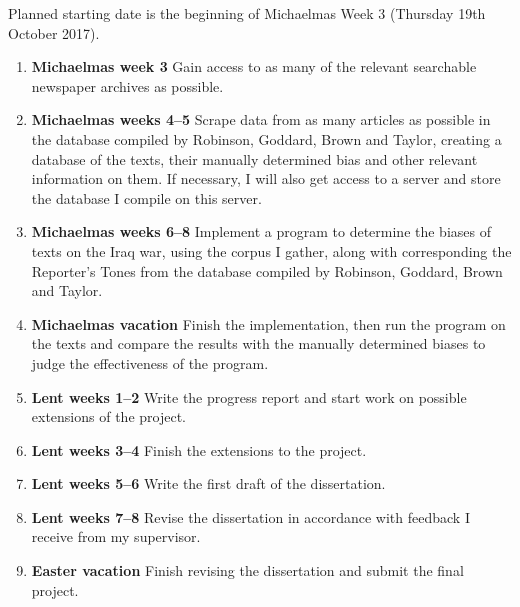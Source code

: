 \documentclass[12pt,a4paper,twoside]{article}
\begin{document}
Planned starting date is the beginning of Michaelmas Week 3 (Thursday 19th October 2017).

\begin{enumerate}

\item \textbf{Michaelmas week 3} Gain access to as many of the relevant searchable newspaper archives as possible.

\item \textbf{Michaelmas weeks 4--5} Scrape data from as many articles as possible in the database compiled by Robinson, Goddard, Brown and Taylor, creating a database of the texts, their manually determined bias and other relevant information on them. If necessary, I will also get access to a server and store the database I compile on this server.

\item \textbf{Michaelmas weeks 6--8} Implement a program to determine the biases of texts on the Iraq war, using the corpus I gather, along with corresponding the Reporter’s Tones from the database compiled by Robinson, Goddard, Brown and Taylor.

\item \textbf{Michaelmas vacation} Finish the implementation, then run the program on the texts and compare the results with the manually determined biases to judge the effectiveness of the program.

\item \textbf{Lent weeks 1--2} Write the progress report and start work on possible extensions of the project.

\item \textbf{Lent weeks 3--4} Finish the extensions to the project.

\item \textbf{Lent weeks 5--6} Write the first draft of the dissertation.

\item \textbf{Lent weeks 7--8} Revise the dissertation in accordance with feedback I receive from my supervisor.

\item \textbf{Easter vacation} Finish revising the dissertation and submit the final project.

\end{enumerate}
\end{document}
